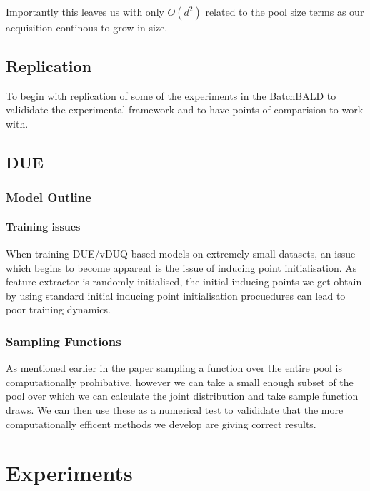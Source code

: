 \documentclass[12pt, a4paper]{report}
\theoremstyle{definition}
\begin{document}
Importantly this leaves us with only $O(d^2)$ related to the pool size terms as our acquisition continous to grow in size.


\section{Replication}

To begin with replication of some of the experiments in the BatchBALD to valididate the experimental framework and to have points of comparision to work with.




\section{DUE}

\subsection{Model Outline}


\subsubsection{Training issues}

When training DUE/vDUQ based models on extremely small datasets, an issue which begins to become apparent is the issue of inducing point initialisation. As feature extractor is randomly initialised, the initial inducing points we get obtain by using standard initial inducing point initialisation procuedures can lead to poor training dynamics.





\subsection{Sampling Functions}

As mentioned earlier in the paper sampling a function over the entire pool is computationally prohibative, however we can take a small enough subset of the pool over which we can calculate the joint distribution and take sample function draws.
We can then use these as a numerical test to valididate that the more computationally efficent methods we develop are giving correct results.


\chapter{Experiments}
\end{document}
